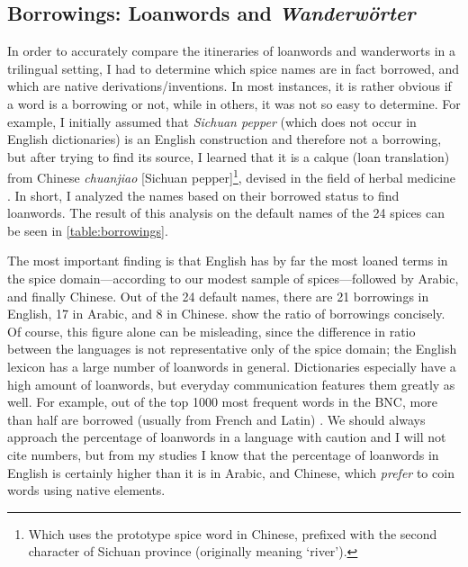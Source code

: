 \subsection{Borrowings: Loanwords and \textit{Wanderwörter}}

In order to accurately compare the itineraries of loanwords and \glspl{wanderwort} in a trilingual setting, I had to determine which spice names are in fact borrowed, and which are native derivations/inventions. In most instances, it is rather obvious if a word is a borrowing or not, while in others, it was not so easy to determine. For example, I initially assumed that \textit{Sichuan pepper} (which does not occur in English dictionaries) is an English construction and therefore not a borrowing, but after trying to find its source, I learned that it is a calque (loan translation) from Chinese  \textit{chuanjiao} [Sichuan pepper]\footnote{Which uses the prototype spice word in Chinese, prefixed with the second character of Sichuan province (originally meaning `river').}, devised in the field of herbal medicine \autocite[140]{hooper_chinese_1929}. In short, I analyzed the names based on their borrowed status to find loanwords. The result of this analysis on the default names of the 24 spices can be seen in \cref{table:borrowings}.

The most important finding is that English has by far the most loaned terms in the spice domain---according to our modest sample of spices---followed by Arabic, and finally Chinese. Out of the 24 default names, there are 21 borrowings in English, 17 in Arabic, and 8 in Chinese.  show the ratio of borrowings concisely. Of course, this figure alone can be misleading, since the difference in ratio between the languages is not representative only of the spice domain; the English lexicon has a large number of loanwords in general. Dictionaries especially have a high amount of loanwords, but everyday communication features them greatly as well. For example, out of the top 1000 most frequent words in the \gls{BNC}, more than half are borrowed (usually from French and Latin) \autocite[38]{durkin_borrowed_2014}. We should always approach the percentage of loanwords in a language with caution and I will not cite numbers, but from my studies I know that the percentage of loanwords in English is certainly higher than it is in Arabic, and Chinese, which \textit{prefer} to coin words using native elements. 



